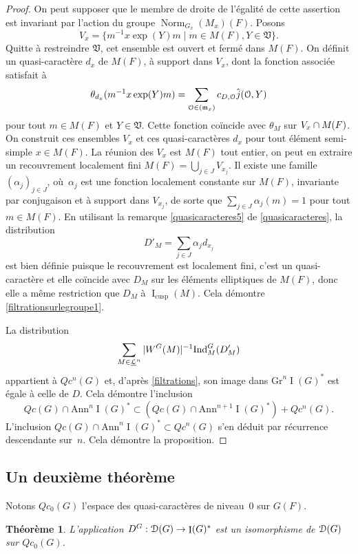 \documentclass[11pt]{article}
\numberwithin{equation}{section}\providecommand{\og}{«\,}\providecommand{\fg}{\,»}
\let\mathcal \EuScript
\newcommand{\NoChangel}[1]{%
\expandafter\let\csname old\string#1\endcsname=#1
\let#1=\relax
\newcommand{#1}{\mathcode`l="716C\csname old\string#1\endcsname\mathcode`l="7160 }%
}
\let\sep\mid
\newcommand{\mfrm}{\mathfrak{m}}
\newcommand{\frV}{\mathfrak{V}}
\newcommand{\Ann}{\mathrm{Ann}}
\newcommand{\cusp}{\mathrm{cusp}}
\newcommand{\rell}{\mathrm{ell}} \NoChangel{\rell}
\newcommand{\Gr}{\mathrm{Gr}}
\newcommand{\Ind}{\mathrm{Ind}}
\newcommand{\Nil}{\mathrm{Nil}} \NoChangel{\Nil}
\DeclareMathOperator{\rI}{I}
\DeclareMathOperator{\Norm}{Norm}
\newcommand{\cD}{\mathcal{D}}
\newcommand{\cL}{\mathcal{L}}
\newcommand{\cO}{\mathcal{O}}
\theoremstyle{plain}
\newtheorem*{thm*}{Théorème}
\theoremstyle{definition}
\begin{document}
\begin{proof}
On peut supposer que le membre de droite de l'égalité de cette assertion est invariant par l'action du groupe $\Norm_{G_{x}}(M_{x})(F) $. Posons
\[
V_{x}=\{m^{-1}x \exp(Y)m\sep m\in M(F), Y\in \frV\}.
\]
Quitte à restreindre $\frV$, cet ensemble est ouvert et fermé dans $M(F)$. On définit un quasi-caractère $d_{x}$ de $M(F)$, à support dans $V_{x}$, dont la fonction associée satisfait à
\[
\theta_{d_{x}}(m^{-1}x \exp(Y)m)=\sum_{\cO\in \Nil(\mfrm_{x})}c_{D,\cO}\hat{j}(\cO,Y)
\]
pour tout $m\in M(F)$ et $Y\in \frV$.
Cette fonction coïncide avec $\theta_{M}$ sur $V_{x}\cap M_{\rell}(F)$. On construit ces ensembles $V_{x}$ et ces quasi-caractères $d_{x}$ pour tout élément semi-simple $x\in M(F)$. La réunion des $V_{x}$ est $M(F)$ tout entier, on peut en extraire un recouvrement localement fini $M(F)=\bigcup_{j\in J}V_{x_{j}}$. Il existe une famille $(\alpha_{j})_{j\in J}$, où~$\alpha_{j}$ est une fonction localement constante sur $M(F)$, invariante par conjugaison et à support dans $V_{x_{j}}$, de sorte que $\sum_{j\in J}\alpha_{j}(m)=1$ pour tout $m\in M(F)$. En utilisant la remarque \eqref{quasicaracteres5} de \ref{quasicaracteres}, la distribution
\[
D'_{M}=\sum_{j\in J}\alpha_{j}d_{x_{j}}
\]
est bien définie puisque le recouvrement est localement fini, c'est un quasi-caractère et elle coïncide avec $D_{M}$ sur les éléments elliptiques de $M(F)$, donc elle a même restriction que $D_{M}$ à $\rI_{\cusp}(M)$. Cela démontre \eqref{filtrationsurlegroupe1}.

La distribution
\[
\sum_{M\in \underline{\cL}^n} \vert W^G(M)\vert ^{-1}\Ind_{M}^G(D'_{M})
\]
appartient à $Qc^n(G)$ et, d'après \ref{filtrations}, son image dans $\Gr^n\rI(G)^*$ est égale à celle de $D$. Cela démontre l'inclusion
\[
Qc(G)\cap \Ann^{n}\rI(G)^*\subset (Qc(G)\cap \Ann^{n+1}\rI(G)^*)+Qc^n(G).
\]
L'inclusion $Qc(G)\cap \Ann^{n}\rI(G)^*\subset Qc^n(G)$ s'en déduit par récurrence descendante sur~$n$. Cela démontre la proposition.
\end{proof}

\subsection{Un deuxième théorème}\label{undeuxiemetheoreme}

Notons $Qc_{0}(G)$ l'espace des quasi-caractères de niveau~$0$ sur $G(F)$.

\begin{thm*}
L'application $D^G:\cD(G)\to \rI(G)^*$ est un isomorphisme de $\cD(G)$ sur $Qc_{0}(G)$.
\end{thm*}
\end{document}

